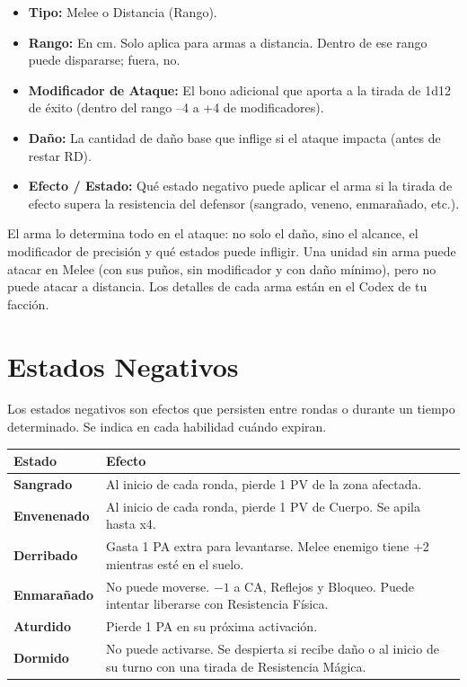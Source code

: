 \begin{itemize}
    \item \textbf{Tipo:} Melee o Distancia (Rango).
    \item \textbf{Rango:} En cm. Solo aplica para armas a distancia. Dentro de ese rango puede dispararse; fuera, no.
    \item \textbf{Modificador de Ataque:} El bono adicional que aporta a la tirada de 1d12 de éxito (dentro del rango --4 a +4 de modificadores).
    \item \textbf{Daño:} La cantidad de daño base que inflige si el ataque impacta (antes de restar RD).
    \item \textbf{Efecto / Estado:} Qué estado negativo puede aplicar el arma si la tirada de efecto supera la resistencia del defensor (sangrado, veneno, enmarañado, etc.).
\end{itemize}

\begin{tcolorbox}[colback=HammerRed!8, colframe=HammerRed, title=\textbf{Regla: El Arma Define el Ataque}]
\small El arma lo determina todo en el ataque: no solo el daño, sino el alcance, el modificador de precisión y qué estados puede infligir. Una unidad sin arma puede atacar en Melee (con sus puños, sin modificador y con daño mínimo), pero no puede atacar a distancia. Los detalles de cada arma están en el Codex de tu facción.
\end{tcolorbox}

\section{Estados Negativos}

Los estados negativos son efectos que persisten entre rondas o durante un tiempo determinado. Se indica en cada habilidad cuándo expiran.

\begin{center}
\begin{tabularx}{\linewidth}{|l|X|}
\hline
\rowcolor{GoldRule!20} \textbf{Estado} & \textbf{Efecto} \\ \hline
\textbf{Sangrado} & Al inicio de cada ronda, pierde 1 PV de la zona afectada. \\ \hline
\textbf{Envenenado} & Al inicio de cada ronda, pierde 1 PV de Cuerpo. Se apila hasta x4. \\ \hline
\textbf{Derribado} & Gasta 1 PA extra para levantarse. Melee enemigo tiene +2 mientras esté en el suelo. \\ \hline
\textbf{Enmarañado} & No puede moverse. $-1$ a CA, Reflejos y Bloqueo. Puede intentar liberarse con Resistencia Física. \\ \hline
\textbf{Aturdido} & Pierde 1 PA en su próxima activación. \\ \hline
\textbf{Dormido} & No puede activarse. Se despierta si recibe daño o al inicio de su turno con una tirada de Resistencia Mágica. \\ \hline
\end{tabularx}
\end{center}

